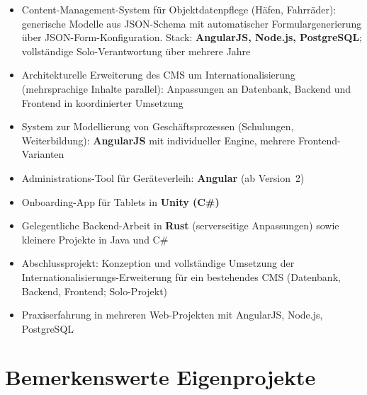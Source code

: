 \begin{itemize}
  \item Content-Management-System für Objektdatenpflege (Häfen, Fahrräder): generische Modelle aus JSON-Schema mit automatischer Formulargenerierung über JSON-Form-Konfiguration. Stack: \textbf{AngularJS, Node.js, PostgreSQL}; vollständige Solo-Verantwortung über mehrere Jahre
  \item Architekturelle Erweiterung des CMS um Internationalisierung (mehrsprachige Inhalte parallel): Anpassungen an Datenbank, Backend und Frontend in koordinierter Umsetzung
  \item System zur Modellierung von Geschäftsprozessen (Schulungen, Weiterbildung): \textbf{AngularJS} mit individueller Engine, mehrere Frontend-Varianten
  \item Administrations-Tool für Geräteverleih: \textbf{Angular} (ab Version~2)
  \item Onboarding-App für Tablets in \textbf{Unity (C\#)}
  \item Gelegentliche Backend-Arbeit in \textbf{Rust} (serverseitige Anpassungen) sowie kleinere Projekte in Java und C\#
\end{itemize}

\begin{itemize}
  \item Abschlussprojekt: Konzeption und vollständige Umsetzung der Internationalisierungs-Erweiterung für ein bestehendes CMS (Datenbank, Backend, Frontend; Solo-Projekt)
  \item Praxiserfahrung in mehreren Web-Projekten mit AngularJS, Node.js, PostgreSQL
\end{itemize}

\section*{Bemerkenswerte Eigenprojekte}

